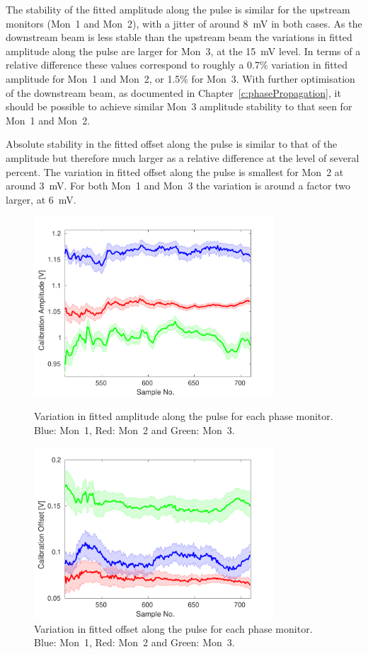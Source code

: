 The stability of the fitted amplitude along the pulse is similar for the upstream monitors (Mon~1 and Mon~2), with a jitter of around 8~mV in both cases. As the downstream beam is less stable than the upstream beam the variations in fitted amplitude along the pulse are larger for Mon~3, at the 15~mV level. In terms of a relative difference these values correspond to roughly a 0.7\% variation in fitted amplitude for Mon~1 and Mon~2, or 1.5\% for Mon~3. With further optimisation of the downstream beam, as documented in Chapter~\ref{c:phasePropagation}, it should be possible to achieve similar Mon~3 amplitude stability to that seen for Mon~1 and Mon~2. 

Absolute stability in the fitted offset along the pulse is similar to that of the amplitude but therefore much larger as a relative difference at the level of several percent. The variation in fitted offset along the pulse is smallest for Mon~2 at around 3~mV. For both Mon~1 and Mon~3 the variation is around a factor two larger, at 6~mV.

\begin{figure}
  \centering
  \includegraphics[width=0.8\textwidth]{Figures/phaseMons/calAmpVsSample}
  \caption{Variation in fitted amplitude along the pulse for each phase monitor. Blue: Mon~1, Red: Mon~2 and Green: Mon~3.}
  \label{f:calAmpVsSample}
  \centering
  \includegraphics[width=0.8\textwidth]{Figures/phaseMons/calOffVsSample}
  \caption{Variation in fitted offset along the pulse for each phase monitor. Blue: Mon~1, Red: Mon~2 and Green: Mon~3.}
  \label{f:calOffVsSample}
\end{figure}

